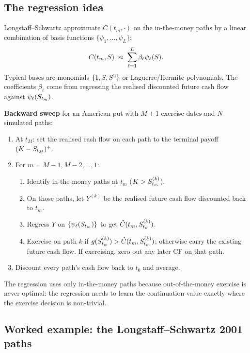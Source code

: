 \subsection{The regression idea}

Longstaff--Schwartz approximate $C(t_m, \cdot)$ on the in-the-money
paths by a linear combination of basis functions
$\{\psi_1, \ldots, \psi_L\}$:
\begin{equation}
  C(t_m, S) \;\approx\; \sum_{\ell=1}^{L} \beta_\ell \psi_\ell(S).
\end{equation}
Typical bases are monomials $\{1, S, S^2\}$ or Laguerre/Hermite
polynomials.  The coefficients $\beta_\ell$ come from regressing the
realised discounted future cash flow against $\psi_\ell(S_{t_m})$.

\begin{keyfactbox}
\textbf{Backward sweep} for an American put with $M+1$ exercise dates
and $N$ simulated paths:
\begin{enumerate}
  \item At $t_M$: set the realised cash flow on each path to the
    terminal payoff $(K - S_{t_M})^+$.
  \item For $m = M-1, M-2, \ldots, 1$:
  \begin{enumerate}
    \item Identify in-the-money paths at $t_m$
      ($K > S_{t_m}^{(k)}$).
    \item On those paths, let $Y^{(k)}$ be the realised future cash
      flow discounted back to $t_m$.
    \item Regress $Y$ on $\{\psi_\ell(S_{t_m})\}$ to get
      $\hat C(t_m, S_{t_m}^{(k)})$.
    \item Exercise on path $k$ if $g(S_{t_m}^{(k)}) > \hat C(t_m,
      S_{t_m}^{(k)})$; otherwise carry the existing future cash
      flow.  If exercising, zero out any later CF on that path.
  \end{enumerate}
  \item Discount every path's cash flow back to $t_0$ and average.
\end{enumerate}
The regression uses only in-the-money paths because
out-of-the-money exercise is never optimal: the regression needs to
learn the continuation value exactly where the exercise decision is
non-trivial.
\end{keyfactbox}

\subsection{Worked example: the Longstaff--Schwartz 2001 paths}

